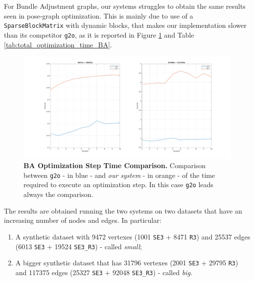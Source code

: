 For Bundle Adjustment graphs, our systems struggles to obtain the same results seen in pose-graph optimization. This is mainly due to use of a \texttt{SparseBlockMatrix} with dynamic blocks, that makes our implementation slower than its competitor \texttt{g2o}, as it is reported in Figure \ref{fig:step_time_BA} and Table \ref{tab:total_optimization_time_BA}.

\begin{figure}[!hbt]
    \centering
    \includegraphics[width=\textwidth]{figures/05_implementation/step_time_BA.pdf}
    \caption{\textbf{BA Optimization Step Time Comparison.} Comparison between \texttt{g2o} - in blue - and \textit{our system} - in orange - of the time required to execute an optimization step. In this case \texttt{g2o} leads always the comparison.} 
    \label{fig:step_time_BA}
\end{figure}

The results are obtained running the two systems on two datasets that have an increasing number of nodes and edges. In particular:

\begin{enumerate}
    \item A synthetic dataset with 9472 vertexes (1001 \texttt{SE3} + 8471 \texttt{R3}) and 25537 edges (6013 \texttt{SE3} + 19524 \texttt{SE3\_R3}) - called \textit{small};
    \item A bigger synthetic dataset that has 31796 vertexes (2001 \texttt{SE3} + 29795 \texttt{R3}) and 117375 edges (25327 \texttt{SE3} + 92048 \texttt{SE3\_R3}) - called \textit{big}.
\end{enumerate}

